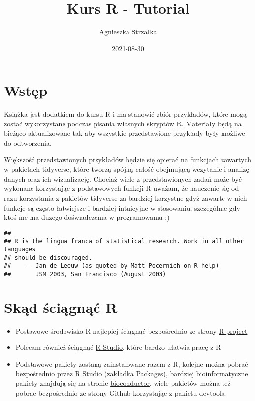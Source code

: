 \documentclass[
]{book}
\title{Kurs R - Tutorial}
\author{Agnieszka Strzałka}
\date{2021-08-30}
\providecommand{\tightlist}{%
  \setlength{\itemsep}{0pt}\setlength{\parskip}{0pt}}
\begin{document}
\maketitle

{
\setcounter{tocdepth}{1}
\tableofcontents
}
\hypertarget{wstux119p}{%
\chapter{Wstęp}\label{wstux119p}}

Książka jest dodatkiem do kursu R i ma stanowić zbiór przykładów, które mogą zostać wykorzystane podczas pisania własnych skryptów R. Materiały będą na bieżąco aktualizowane tak aby wszystkie przedstawione przykłady były możliwe do odtworzenia.

Większość przedstawionych przykładów będzie się opierać na funkcjach zawartych w pakietach tidyverse, które tworzą spójną całość obejmującą wczytanie i analizę danych oraz ich wizualizację. Chociaż wiele z przedstawionych zadań może być wykonane korzystając z podstawowych funkcji R uważam, że nauczenie się od razu korzystania z pakietów tidyverse za bardziej korzystne gdyż zawarte w nich funkcje są często łatwiejsze i bardziej intuicyjne w stosowaniu, szczególnie gdy ktoś nie ma dużego doświadczenia w programowaniu ;)

\begin{verbatim}
## 
## R is the lingua franca of statistical research. Work in all other languages
## should be discouraged.
##    -- Jan de Leeuw (as quoted by Matt Pocernich on R-help)
##       JSM 2003, San Francisco (August 2003)
\end{verbatim}

\hypertarget{skux105d-ux15bciux105gnux105ux107-r}{%
\chapter{Skąd ściągnąć R}\label{skux105d-ux15bciux105gnux105ux107-r}}

\begin{itemize}
\tightlist
\item
  Postawowe środowisko R najlepiej ściągnąć bezpośrednio ze strony \href{http://www.r-project.org/}{R project}
\item
  Polecam również ściągnąć \href{http://www.rstudio.com/}{R Studio}, które bardzo ułatwia pracę z R
\item
  Podstawowe pakiety zostaną zainstalowane razem z R, kolejne można pobrać bezpośrednio przez R Studio (zakładka Packages), bardziej bioinformatyczne pakiety znajdują się na stronie \href{http://www.bioconductor.org/}{bioconductor},
  wiele pakietów można też pobrac bezpośrednio ze strony Github korzystając z pakietu devtools.
\end{itemize}
\end{document}
